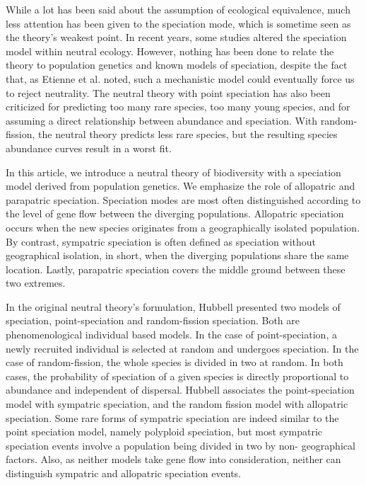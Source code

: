 \documentclass[12pt]{article}
\begin{document}
While a lot has been said about the assumption of ecological equivalence, much
less attention has been given to the speciation mode, which is sometime seen
as the theory's weakest point. In recent years, some studies altered the
speciation model within neutral ecology. However, nothing has been done to
relate the theory to population genetics and known models of speciation,
despite the fact that, as Etienne et al. noted, such a mechanistic model could
eventually force us to reject neutrality. The neutral theory with point
speciation has also been criticized for predicting too many rare species, too
many young species, and for assuming a direct relationship between abundance
and speciation. With random-fission, the neutral theory predicts less rare
species, but the resulting species abundance curves result in a worst fit.

In this article, we introduce a neutral theory of biodiversity with a
speciation model derived from population genetics. We emphasize the role of
allopatric and parapatric speciation. Speciation modes are most often
distinguished according to the level of gene flow between the diverging
populations. Allopatric speciation occurs when the new species originates from
a geographically isolated population. By contrast, sympatric speciation is
often defined as speciation without geographical isolation, in short, when the
diverging populations share the same location. Lastly, parapatric speciation
covers the middle ground between these two extremes.

In the original neutral theory's formulation, Hubbell presented two models of
speciation, point-speciation and random-fission speciation. Both are
phenomenological individual based models. In the case of point-speciation, a
newly recruited individual is selected at random and undergoes speciation. In
the case of random-fission, the whole species is divided in two at random. In
both cases, the probability of speciation of a given species is directly
proportional to abundance and independent of dispersal. Hubbell associates the
point-speciation model with sympatric speciation, and the random fission model
with allopatric speciation. Some rare forms of sympatric speciation are indeed
similar to the point speciation model, namely polyploid speciation, but most
sympatric speciation events involve a population being divided in two by non-
geographical factors. Also, as neither models take gene flow into
consideration, neither can distinguish sympatric and allopatric speciation
events.
\end{document}
